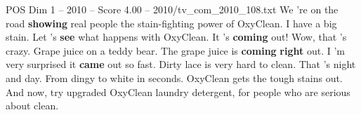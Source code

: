 \begin{textsample}{POS Dim 1 – 2010 – Score 4.00 – 2010/tv\_com\_2010\_108.txt}  \label{ex:f1_pos_065}
We 're on the road \textbf{showing} real people the stain-fighting power of OxyClean.
I have a big stain.
Let 's \textbf{see} what happens with OxyClean.
It 's \textbf{coming} out!
Wow, that 's crazy.
Grape juice on a teddy bear.
The grape juice is \textbf{coming} \textbf{right} out.
I 'm very surprised it \textbf{came} out so fast.
Dirty lace is very hard to clean.
That 's night and day.
From dingy to white in seconds.
OxyClean gets the tough stains out.
And now, try upgraded OxyClean laundry detergent, for people who are serious about clean.

\end{textsample}

